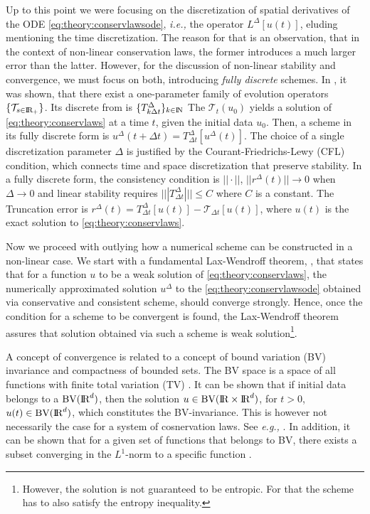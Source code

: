 \documentclass[11pt,a4paper,headinclude=true,DIV=14,BCOR=8mm,chapterprefix,listof=totoc,twoside,openright,abstracton]{scrbook}
\begin{document}
Up to this point we were focusing on the discretization of spatial derivatives of the ODE \ref{eq:theory:conservlawsode}, \textit{i.e.,} the operator $L^{\Delta}[u(t)]$, eluding mentioning the time discretization. The reason for that is an observation, that in the context of non-linear conservation laws, the former introduces a much larger error than the latter. However, for the discussion of non-linear stability and convergence, we must focus on both, introducing \textit{fully discrete} schemes.
In \cite{Kruzkov:1970}, it was shown, that there exist a one-parameter family of evolution operators $\{\mathcal{T}_{s\in\text{I\!R}_+}\}$. Its discrete from is $\{ T^{\Delta} _{k \Delta t} \}_{k\in\text{I\!N}}$ The $\mathcal{T}_t(u_0)$ yields a solution of \ref{eq:theory:conservlaws} at a time $t$, given the initial data $u_0$. Then, a scheme in its fully discrete form is $ u^{\Delta}(t+\Delta t) = T^{\Delta} _{\Delta t}[u^{\Delta}(t)]$. The choice of a single discretization parameter $\Delta$ is justified by the Courant-Friedrichs-Lewy (CFL) condition, which connects time and space discretization that preserve stability. 
In a fully discrete form, the consistency condition is $||\cdot||$, $||r^{\Delta}(t)||\rightarrow 0$ when $\Delta\rightarrow 0$ and linear stability requires $|||T^{\Delta}_{\Delta t}||| \leq C$ where $C$ is a constant. The Truncation error is $r^{\Delta}(t) = T^{\Delta}_{\Delta t}[u(t)] - \mathcal{T}_{\Delta t}[u(t)]$, where $u(t)$ is the exact solution to \ref{eq:theory:conservlaws}. 


Now we proceed with outlying how a numerical scheme can be constructed in a non-linear case. We start with a fundamental Lax-Wendroff theorem, \cite{Lax:1960}, that states that for a function $u$ to be a weak solution of \ref{eq:theory:conservlaws}, the numerically approximated solution $u^{\Delta}$ to the \ref{eq:theory:conservlawsode} obtained via conservative and consistent scheme, should converge strongly. Hence, once the condition for a scheme to be convergent is found, the Lax-Wendroff theorem assures that solution obtained via such a scheme is weak solution\footnote{However, the solution is not guaranteed to be entropic. For that the scheme has to also satisfy the entropy inequality.}. 

A concept of convergence is related to a concept of bound variation (BV) invariance and compactness of bounded sets. The BV space is a space of all functions with finite total variation (TV) \cite{Luigi:2002}. It can be shown that if initial data belongs to a $\text{BV}(\text{I\!R}^d)$, then the solution $u \in \text{BV}(\text{I\!R}\times\text{I\!R}^d)$, for $t > 0$, $u(t) \in \text{BV}(\text{I\!R}^d)$, which constitutes the BV-invariance. This is however not necessarily the case for a system of cosnervation laws. See \textit{e.g.,} \cite{Chen:2006}. In addition, it can be shown that for a given set of functions that belongs to BV, there exists a subset converging in the $L^1$-norm to a specific function \cite{Luigi:2002}. 
\end{document}
